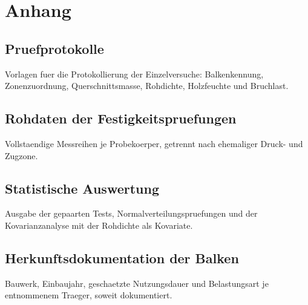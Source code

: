 \chapter{Anhang}

\section{Pruefprotokolle}
Vorlagen fuer die Protokollierung der Einzelversuche: Balkenkennung,
Zonenzuordnung, Querschnittsmasse, Rohdichte, Holzfeuchte und Bruchlast.

\section{Rohdaten der Festigkeitspruefungen}
Vollstaendige Messreihen je Probekoerper, getrennt nach ehemaliger Druck- und
Zugzone.

\section{Statistische Auswertung}
Ausgabe der gepaarten Tests, Normalverteilungspruefungen und der Kovarianzanalyse
mit der Rohdichte als Kovariate.

\section{Herkunftsdokumentation der Balken}
Bauwerk, Einbaujahr, geschaetzte Nutzungsdauer und Belastungsart je entnommenem
Traeger, soweit dokumentiert.
